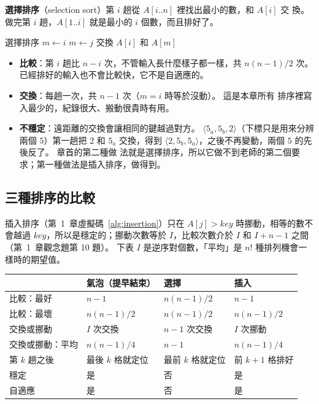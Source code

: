\textbf{選擇排序}（selection sort）第 $i$ 趟從 $A[i..n]$ 裡找出最小的數，和 $A[i]$ 交
換。 做完第 $i$ 趟，$A[1..i]$ 就是最小的 $i$ 個數，而且排好了。

\begin{pseudo}[label=alg:so-selection]{選擇排序}
        \State $m \gets i$ 
                \State $m \gets j$
            \EndIf
        \EndFor
        \State 交換 $A[i]$ 和 $A[m]$
    \EndFor
\EndProcedure
\end{pseudo}

\begin{itemize}
\item \textbf{比較}：第 $i$ 趟比 $n - i$ 次，不管輸入長什麼樣子都一樣，共
$n(n-1)/2$ 次。 已經排好的輸入也不會比較快，它不是自適應的。
\item \textbf{交換}：每趟一次，共 $n - 1$ 次（$m = i$ 時等於沒動）。 這是本章所有
排序裡寫入最少的，紀錄很大、搬動很貴時有用。
\item \textbf{不穩定}：遠距離的交換會讓相同的鍵越過對方。 $\langle 5_a, 5_b, 2
\rangle$（下標只是用來分辨兩個 $5$）第一趟把 $2$ 和 $5_a$ 交換，得到
$\langle 2, 5_b, 5_a \rangle$，之後不再變動，兩個 $5$ 的先後反了。 章首的第二種做
法就是選擇排序，所以它做不到老師的第二個要求；第一種做法是插入排序，做得到。
\end{itemize}

\subsection{三種排序的比較}

插入排序（第~1~章虛擬碼~\ref{alg:insertion}）只在 $A[j] > \mathit{key}$ 時挪動，相等的數不會越過
$\mathit{key}$，所以是穩定的；挪動次數等於 $I$，比較次數介於 $I$ 和 $I + n - 1$ 之間
（第~1~章觀念題第 10 題）。 下表 $I$ 是逆序對個數，「平均」是 $n!$ 種排列機會一樣時的期望值。

\begin{center}
\begin{tabular}{llll}
\toprule
& 氣泡（提早結束） & 選擇 & 插入 \\
\midrule
比較：最好 & $n - 1$ & $n(n-1)/2$ & $n - 1$ \\
比較：最壞 & $n(n-1)/2$ & $n(n-1)/2$ & $n(n-1)/2$ \\
交換或挪動 & $I$ 次交換 & $n - 1$ 次交換 & $I$ 次挪動 \\
交換或挪動：平均 & $n(n-1)/4$ & $n - 1$ & $n(n-1)/4$ \\
第 $k$ 趟之後 & 最後 $k$ 格就定位 & 最前 $k$ 格就定位 & 前 $k + 1$ 格排好 \\
穩定 & 是 & 否 & 是 \\
自適應 & 是 & 否 & 是 \\
\bottomrule
\end{tabular}
\end{center}

